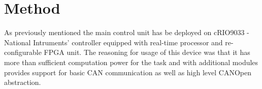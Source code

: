 




\chapter{Method}
As previously mentioned the main control unit has be deployed on cRIO9033 - National Intruments' controller equipped with real-time processor and re-configurable FPGA unit. The reasoning for usage of this device was that it has more than sufficient computation power for the task and with additional modules provides support for basic CAN communication as well as high level CANOpen abstraction.


